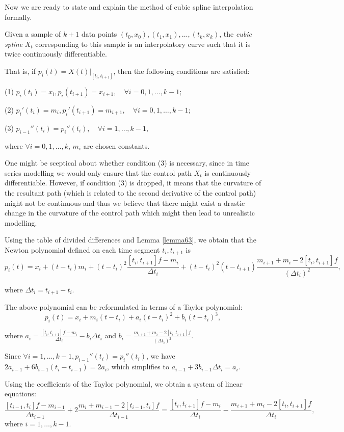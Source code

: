 \documentclass[a4paper,11pt,titlepage]{article}
\theoremstyle{definition}
\theoremstyle{plain}
\theoremstyle{remark}
\begin{document}
Now we are ready to state and explain the method of cubic spline interpolation formally.

 Given a sample of $k+1$ data points
$(t_0,x_0), (t_1,x_1), \dots, (t_k,x_k)$, the \textit{cubic spline} $X_t$ corresponding to this sample is an interpolatory curve such that it is twice continuously differentiable.

That is, if $p_i(t)=X(t)|_{[t_i,t_{i+1}]}$, then the following conditions are satisfied:

(1) $p_i(t_i)=x_i, p_i(t_{i+1})=x_{i+1},\quad\forall i=0,1,\dots,k-1;$

(2) $p_i'(t_i)=m_i, p_i'(t_{i+1})=m_{i+1},\quad\forall i=0,1,\dots,k-1;$

(3) $p_{i-1}''(t_i)=p_i''(t_i),\quad\forall i=1,\dots,k-1,$

where $\forall i=0,1,\dots,k$, $m_i$ are chosen constants.

One might be sceptical about whether condition (3) is necessary, since in time series modelling we would only ensure that the control path $X_t$ is continuously differentiable. However, if condition (3) is dropped, it means that the curvature of the resultant path (which is related to the second derivative of the control path) might not be continuous and thus we believe that there might exist a drastic change in the curvature of the control path which might then lead to unrealistic modelling.

Using the table of divided differences and Lemma \ref{lemma63}, we obtain that the Newton polynomial defined on each time segment $t_i,t_{i+1}$ is
$$p_i(t)=x_i+(t-t_i)m_i+(t-t_i)^2\frac{[t_i,t_{i+1}]f-m_i}{\Delta t_i}+(t-t_i)^2(t-t_{i+1})\frac{m_{i+1}+m_i-2[t_i,t_{i+1}]f}{(\Delta t_i)^2},$$

where $\Delta t_i=t_{i+1}-t_i$.

The above polynomial can be reformulated in terms of a Taylor polynomial:
$$p_i(t)=x_i+m_i(t-t_i)+a_i(t-t_i)^2+b_i(t-t_i)^3,$$

where $\displaystyle a_i=\frac{[t_i,t_{i+1}]f-m_i}{\Delta t_i}-b_i\Delta t_i$ and $\displaystyle b_i=\frac{m_{i+1}+m_i-2[t_i,t_{i+1}]f}{(\Delta t_i)^2}$.

Since $\forall i=1,\dots,k-1, p_{i-1}''(t_i)=p_i''(t_i)$, we have $2a_{i-1}+6b_{i-1}(t_i-t_{i-1})=2a_i$, which simplifies to $a_{i-1}+3b_{i-1}\Delta t_i=a_i$.

Using the coefficients of the Taylor polynomial, we obtain a system of linear equations:
$$\frac{[t_{i-1},t_i]f-m_{i-1}}{\Delta t_{i-1}}+2\frac{m_i+m_{i-1}-2[t_{i-1},t_i]f}{\Delta t_{i-1}}=\frac{[t_i,t_{i+1}]f-m_i}{\Delta t_{i}}-\frac{m_{i+1}+m_{i}-2[t_{i},t_{i+1}]f}{\Delta t_{i}},$$
where $i=1,\dots,k-1$.
\end{document}
